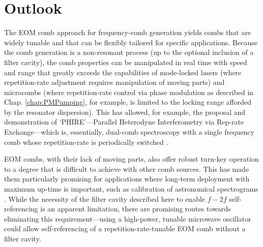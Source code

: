\section{Outlook}
The EOM comb approach for frequency-comb generation yields combs that are widely tunable and that can be flexibly tailored for specific applications. Because the comb generation is a non-resonant process (up to the optional inclusion of a filter cavity), the comb properties can be manipulated in real time with speed and range that greatly exceeds the capabilities of mode-locked lasers (where repetition-rate adjustment requires manipulation of moving parts) and microcombs (where repetition-rate control via phase modulation as described in Chap. \ref{chap:PMPumping}, for example, is limited to the locking range afforded by the resonator dispersion). This has allowed, for example, the proposal and demonstration of `PHIRE'---Parallel Heterodyne Interferometry via Rep-rate Exchange---which is, essentially, dual-comb spectroscopy \cite{Coddington2016} with a single frequency comb whose repetition-rate is periodically switched \cite{Carlson2018}. 

EOM combs, with their lack of moving parts, also offer robust turn-key operation to a degree that is difficult to achieve with other comb sources. This has made them particularly promising for applications where long-term deployment with maximum up-time is important, such as calibration of astronomical spectrograms \cite{Metcalf2018}. While the necessity of the filter cavity described here to enable $f-2f$ self-referencing is an apparent limitation, there are promising routes towards eliminating this requirement---using a high-power, tunable microwave oscillator could allow self-referencing of a repetition-rate-tunable EOM comb without a filter cavity.

